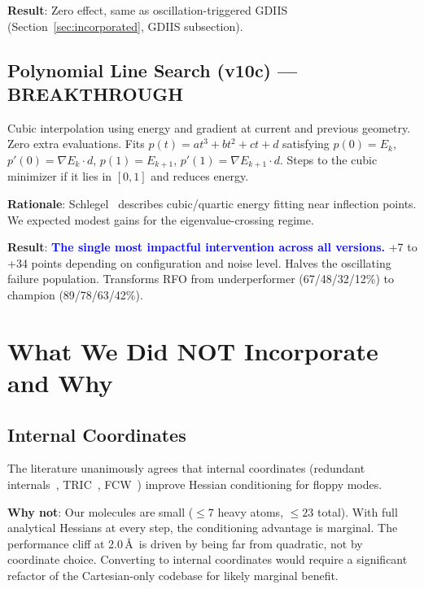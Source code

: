 \documentclass[11pt,a4paper]{article}
\theoremstyle{definition}
\begin{document}
\textbf{Result}: Zero effect, same as oscillation-triggered GDIIS
(Section~\ref{sec:incorporated}, GDIIS subsection).

\subsection{Polynomial Line Search (v10c) --- BREAKTHROUGH}
\label{sec:pls}

Cubic interpolation using energy and gradient at current and previous
geometry.  Zero extra evaluations.  Fits $p(t) = at^3 + bt^2 + ct + d$
satisfying $p(0) = E_k$, $p'(0) = \nabla E_k \cdot d$,
$p(1) = E_{k+1}$, $p'(1) = \nabla E_{k+1} \cdot d$.  Steps to the
cubic minimizer if it lies in $[0, 1]$ and reduces energy.

\textbf{Rationale}: Schlegel~\citep{schlegel2011} describes cubic/quartic
energy fitting near inflection points.  We expected modest gains for
the eigenvalue-crossing regime.

\textbf{Result}: \textcolor{blue}{\textbf{The single most impactful
intervention across all versions.}}  +7 to +34 points depending on
configuration and noise level.  Halves the oscillating failure population.
Transforms RFO from underperformer (67/48/32/12\%) to champion
(89/78/63/42\%).

\section{What We Did NOT Incorporate and Why}
\label{sec:not-incorporated}

\subsection{Internal Coordinates}
\label{sec:internal-coords}

The literature unanimously agrees that internal coordinates (redundant
internals~\citep{pulay-redundant}, TRIC~\citep{wang-tric},
FCW~\citep{lindh-fcw}) improve Hessian conditioning for floppy modes.

\textbf{Why not}: Our molecules are small ($\leq 7$ heavy atoms, $\leq 23$
total).  With full analytical Hessians at every step, the conditioning
advantage is marginal.  The performance cliff at 2.0\,\AA\ is driven by
being far from quadratic, not by coordinate choice.  Converting to internal
coordinates would require a significant refactor of the Cartesian-only
codebase for likely marginal benefit.
\end{document}
